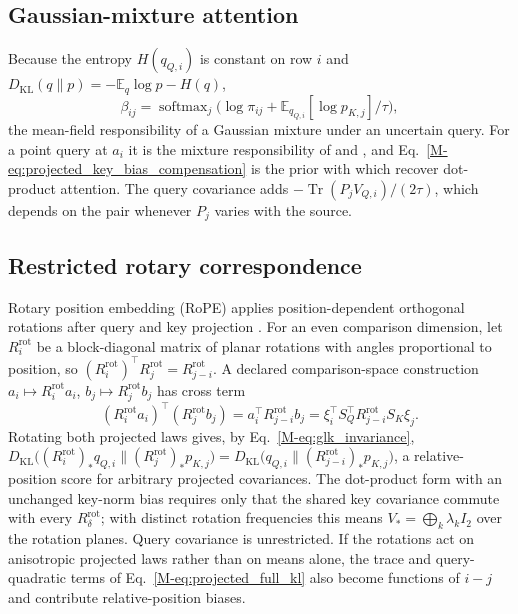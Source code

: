 \documentclass[twoside,11pt]{article}
\newcommand{\softmax}{\operatorname{softmax}}
\begin{document}
\subsection{Gaussian-mixture attention}
\label{supp:mixture_attention}

\begin{remark}
\label{rem:gaussian_mixture_attention}
Because the entropy $H(q_{Q,i})$ is constant on row $i$ and $D_{\mathrm{KL}}(q\|p)=-\mathbb E_q\log p-H(q)$,
\begin{equation}
\beta_{ij}=\softmax_j\bigl(\log\pi_{ij}+\mathbb E_{q_{Q,i}}[\log p_{K,j}]/\tau\bigr),
\end{equation}
the mean-field responsibility of a Gaussian mixture under an uncertain query. For a point query at $a_i$ it is the mixture responsibility of \citet{Movellan2020ProbabilisticTransformers} and \citet{Nguyen2022MGK}, and Eq.~\eqref{M-eq:projected_key_bias_compensation} is the prior with which \citet[Eqs.~16 to 21]{Movellan2020ProbabilisticTransformers} recover dot-product attention. The query covariance adds $-\operatorname{Tr}(P_jV_{Q,i})/(2\tau)$, which depends on the pair whenever $P_j$ varies with the source.
\end{remark}

\subsection{Restricted rotary correspondence}
\label{sec:rope}

Rotary position embedding (RoPE) applies position-dependent orthogonal rotations after query and key projection \citep{su2024roformer}. For an even comparison dimension, let $R^{\mathrm{rot}}_i$ be a block-diagonal matrix of planar rotations with angles proportional to position, so $(R^{\mathrm{rot}}_i)^\top R^{\mathrm{rot}}_j=R^{\mathrm{rot}}_{j-i}$. A declared comparison-space construction $a_i\mapsto R^{\mathrm{rot}}_i a_i$, $b_j\mapsto R^{\mathrm{rot}}_jb_j$ has cross term
\begin{equation}
(R^{\mathrm{rot}}_i a_i)^\top(R^{\mathrm{rot}}_jb_j)
=a_i^\top R^{\mathrm{rot}}_{j-i}b_j
=\xi_i^\top S_Q^\top R^{\mathrm{rot}}_{j-i}S_K\xi_j.
\label{eq:projected_rope_kernel}
\end{equation}
Rotating both projected laws gives, by Eq.~\eqref{M-eq:glk_invariance}, $D_{\mathrm{KL}}\bigl((R^{\mathrm{rot}}_i)_*q_{Q,i}\|(R^{\mathrm{rot}}_j)_*p_{K,j}\bigr)=D_{\mathrm{KL}}\bigl(q_{Q,i}\|(R^{\mathrm{rot}}_{j-i})_*p_{K,j}\bigr)$, a relative-position score for arbitrary projected covariances. The dot-product form with an unchanged key-norm bias requires only that the shared key covariance commute with every $R^{\mathrm{rot}}_\delta$; with distinct rotation frequencies this means $V_*=\bigoplus_k\lambda_kI_2$ over the rotation planes. Query covariance is unrestricted. If the rotations act on anisotropic projected laws rather than on means alone, the trace and query-quadratic terms of Eq.~\eqref{M-eq:projected_full_kl} also become functions of $i-j$ and contribute relative-position biases.
\end{document}
